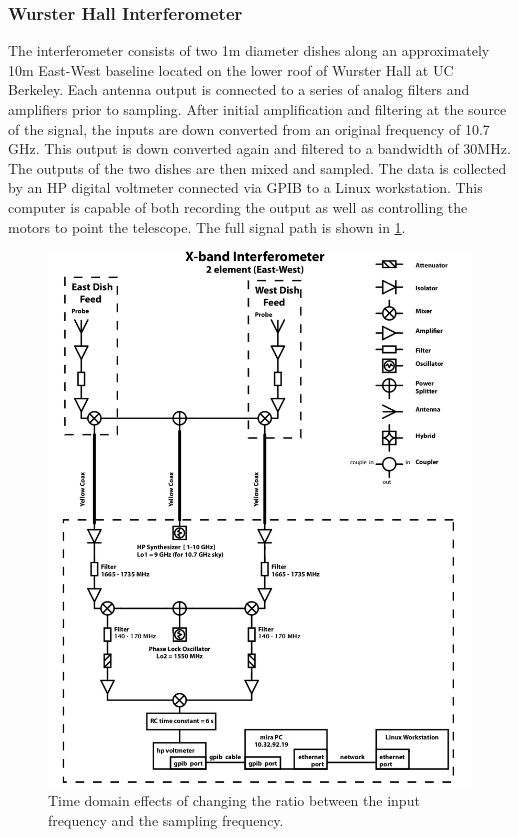 \documentclass{article}
\begin{document}
  \subsubsection{Wurster Hall Interferometer}
  The interferometer consists of two 1m diameter dishes along an approximately
  10m East-West baseline located on the lower roof of Wurster Hall at UC
  Berkeley. Each antenna output is connected to a series of analog
  filters and amplifiers prior to sampling.  After initial amplification and
  filtering at the source of the signal, the inputs are down converted from an
  original frequency of 10.7 GHz. This output is down converted again and
  filtered to a bandwidth of 30MHz. The outputs of the two dishes are then mixed
  and sampled.  The data is collected by an HP digital voltmeter connected via
  GPIB to a Linux workstation. This computer is capable of both recording the
  output as well as controlling the motors to point the telescope. The full
  signal path is shown in \ref{fig:signal_path}.

    \begin{figure}[h!]
    \centering
    \includegraphics[scale=0.3]{img/signal_path.png}
    \caption{Time domain effects of changing the ratio between the input frequency and the sampling frequency.}
    \label{fig:signal_path}
    \end{figure}
\end{document}
